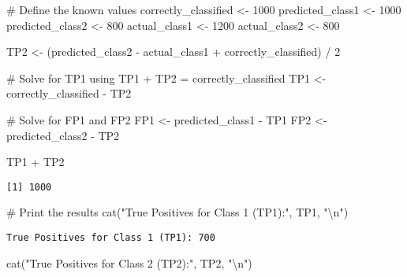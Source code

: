 \documentclass[
  letterpaper,
  DIV=11,
  numbers=noendperiod]{scrreprt}
\newenvironment{Shaded}{\begin{snugshade}}{\end{snugshade}}
\newcommand{\CommentTok}[1]{\textcolor[rgb]{0.37,0.37,0.37}{#1}}
\newcommand{\DecValTok}[1]{\textcolor[rgb]{0.68,0.00,0.00}{#1}}
\newcommand{\FunctionTok}[1]{\textcolor[rgb]{0.28,0.35,0.67}{#1}}
\newcommand{\NormalTok}[1]{\textcolor[rgb]{0.00,0.23,0.31}{#1}}
\newcommand{\OtherTok}[1]{\textcolor[rgb]{0.00,0.23,0.31}{#1}}
\newcommand{\SpecialCharTok}[1]{\textcolor[rgb]{0.37,0.37,0.37}{#1}}
\newcommand{\StringTok}[1]{\textcolor[rgb]{0.13,0.47,0.30}{#1}}
\begin{document}
\begin{Shaded}
\begin{Highlighting}[]
\CommentTok{\# Define the known values}
\NormalTok{correctly\_classified }\OtherTok{\textless{}{-}} \DecValTok{1000}
\NormalTok{predicted\_class1 }\OtherTok{\textless{}{-}} \DecValTok{1000}
\NormalTok{predicted\_class2 }\OtherTok{\textless{}{-}} \DecValTok{800}
\NormalTok{actual\_class1 }\OtherTok{\textless{}{-}} \DecValTok{1200}
\NormalTok{actual\_class2 }\OtherTok{\textless{}{-}} \DecValTok{800}


\NormalTok{TP2 }\OtherTok{\textless{}{-}}\NormalTok{ (predicted\_class2 }\SpecialCharTok{{-}}\NormalTok{ actual\_class1 }\SpecialCharTok{+}\NormalTok{ correctly\_classified) }\SpecialCharTok{/} \DecValTok{2}

\CommentTok{\# Solve for TP1 using TP1 + TP2 = correctly\_classified}
\NormalTok{TP1 }\OtherTok{\textless{}{-}}\NormalTok{ correctly\_classified }\SpecialCharTok{{-}}\NormalTok{ TP2}

\CommentTok{\# Solve for FP1 and FP2}
\NormalTok{FP1 }\OtherTok{\textless{}{-}}\NormalTok{ predicted\_class1 }\SpecialCharTok{{-}}\NormalTok{ TP1}
\NormalTok{FP2 }\OtherTok{\textless{}{-}}\NormalTok{ predicted\_class2 }\SpecialCharTok{{-}}\NormalTok{ TP2}

\NormalTok{TP1 }\SpecialCharTok{+}\NormalTok{ TP2}
\end{Highlighting}
\end{Shaded}

\begin{verbatim}
[1] 1000
\end{verbatim}

\begin{Shaded}
\begin{Highlighting}[]
\CommentTok{\# Print the results}
\FunctionTok{cat}\NormalTok{(}\StringTok{"True Positives for Class 1 (TP1):"}\NormalTok{, TP1, }\StringTok{"}\SpecialCharTok{\textbackslash{}n}\StringTok{"}\NormalTok{)}
\end{Highlighting}
\end{Shaded}

\begin{verbatim}
True Positives for Class 1 (TP1): 700 
\end{verbatim}

\begin{Shaded}
\begin{Highlighting}[]
\FunctionTok{cat}\NormalTok{(}\StringTok{"True Positives for Class 2 (TP2):"}\NormalTok{, TP2, }\StringTok{"}\SpecialCharTok{\textbackslash{}n}\StringTok{"}\NormalTok{)}
\end{Highlighting}
\end{Shaded}
\end{document}
